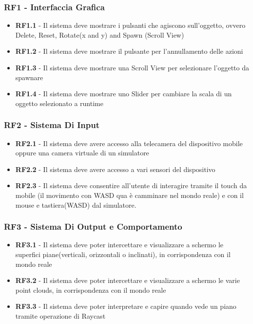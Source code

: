 \subsubsection{RF1 - Interfaccia Grafica}
\begin{itemize}
    \item \textbf{RF1.1} - Il sistema deve mostrare i pulsanti che agiscono sull'oggetto, ovvero Delete, Reset, Rotate(x and y) and Spawn (Scroll View)
    \item \textbf{RF1.2} - Il sistema deve mostrare il pulsante per l'annullamento delle azioni
    \item \textbf{RF1.3} - Il sistema deve mostrare una Scroll View per selezionare l'oggetto da spawnare
    \item \textbf{RF1.4} - Il sistema deve mostrare uno Slider per cambiare la scala di un oggetto selezionato a runtime
\end{itemize}

\subsubsection{RF2 - Sistema Di Input}
\begin{itemize}
    \item \textbf{RF2.1} - Il sistema deve avere accesso alla telecamera del dispositivo mobile oppure una camera virtuale di un simulatore
    \item \textbf{RF2.2} - Il sistema deve avere accesso a vari sensori del dispositivo
    \item \textbf{RF2.3} - Il sistema deve consentire all'utente di interagire tramite il touch da mobile (il movimento con WASD qua è camminare nel mondo reale) e con il mouse e tastiera(WASD) dal simulatore.
\end{itemize}

\subsubsection{RF3 - Sistema Di Output e Comportamento}
\begin{itemize}
    \item \textbf{RF3.1} - Il sistema deve poter intercettare e visualizzare a schermo le superfici piane(verticali, orizzontali o inclinati), in corrispondenza con il mondo reale
    \item \textbf{RF3.2} - Il sistema deve poter intercettare e visualizzare a schermo le varie point clouds, in corrispondenza con il mondo reale 
    \item \textbf{RF3.3} - Il sistema deve poter interpretare e capire quando vede un piano tramite operazione di Raycast
\end{itemize}

